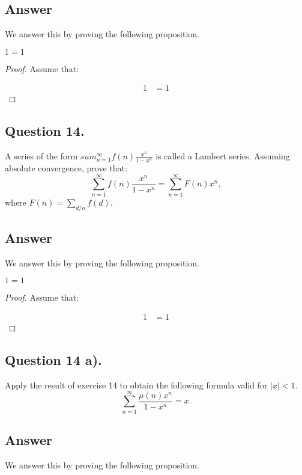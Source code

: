 \subsection*{Answer}
\noindent
We answer this by proving the following proposition.

\begin{proposition}
    $1=1$
\end{proposition}

\begin{proof}
    Assume that:

    \begin{align*}
        1 &= 1
    \end{align*}

\end{proof}


\subsection{Question 14.}
\noindent
A series of the form $sum_{n=1}^{\infty}f(n)\frac{x^n}{1-x^n}$ is called a Lambert series. Assuming absolute
convergence, prove that:
\[
    \sum_{n=1}^{\infty}f(n) \frac{x^n}{1-x^n} = \sum_{n=1}^{\infty} F(n)x^n,
\]
where $F(n) = \sum_{d/n}f(d)$.

\subsection*{Answer}
\noindent
We answer this by proving the following proposition.

\begin{proposition}
    $1=1$
\end{proposition}

\begin{proof}
    Assume that:

    \begin{align*}
        1 &= 1
    \end{align*}

\end{proof}


\subsection{Question 14 a).}
\noindent
Apply the result of exercise 14 to obtain the following formula valid for $|x|<1$.
\[
    \sum_{n=1}^{\infty} \frac{\mu(n) x^n}{1-x^n} = x.
\]

\subsection*{Answer}
\noindent
We answer this by proving the following proposition.

